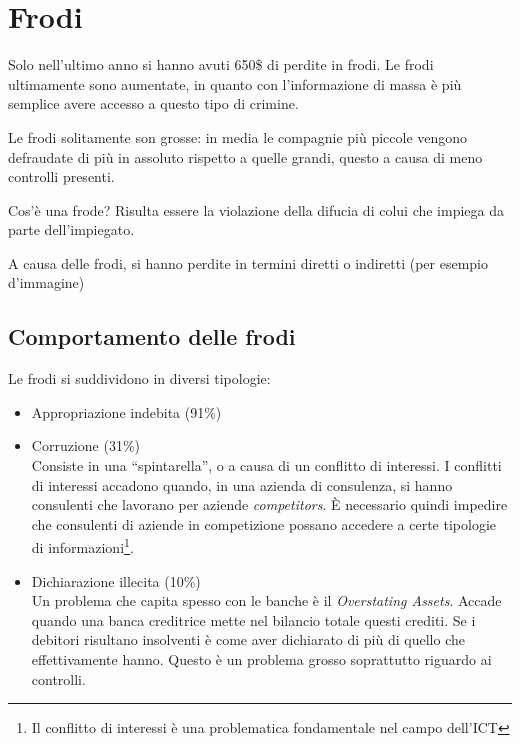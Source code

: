 \chapter{Frodi}
\label{Frodi}

Solo nell'ultimo anno si hanno avuti 650\$ di perdite in frodi. Le frodi
ultimamente sono aumentate, in quanto con l'informazione di massa è più
semplice avere accesso a questo tipo di crimine.

Le frodi solitamente son grosse: in media le compagnie più piccole vengono
defraudate di più in assoluto rispetto a quelle grandi, questo a causa di meno
controlli presenti.

Cos'è una frode? Risulta essere la violazione della difucia di colui che
impiega da parte dell'impiegato.

A causa delle frodi, si hanno perdite in termini diretti o indiretti (per
esempio d'immagine)

\section{Comportamento delle frodi}

Le frodi si suddividono in diversi tipologie:

\begin{itemize}
  \item Appropriazione indebita (91\%)
  \item Corruzione (31\%) \\
  Consiste in una ``spintarella'', o a causa di un conflitto di interessi. I
  conflitti di interessi accadono quando, in una azienda di consulenza, si
  hanno consulenti che lavorano per aziende \textit{competitors}. È necessario
  quindi impedire che consulenti di aziende in competizione possano accedere a
  certe tipologie di informazioni\footnote{Il conflitto di interessi è una
  problematica fondamentale nel campo dell'ICT}.
  \item Dichiarazione illecita (10\%) \\
  Un problema che capita spesso con le banche è il \textit{Overstating Assets}.
  Accade quando una banca creditrice mette nel bilancio totale questi crediti.
  Se i debitori risultano insolventi è come aver dichiarato di più di quello
  che effettivamente hanno. Questo è un problema grosso soprattutto riguardo ai
  controlli.
\end{itemize}
